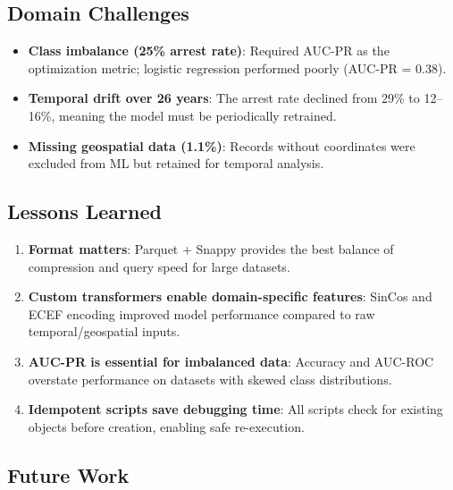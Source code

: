 \subsection{Domain Challenges}

\begin{itemize}
    \item \textbf{Class imbalance (25\% arrest rate)}: Required AUC-PR as the optimization metric; logistic regression performed poorly (AUC-PR = 0.38).
    \item \textbf{Temporal drift over 26 years}: The arrest rate declined from 29\% to 12--16\%, meaning the model must be periodically retrained.
    \item \textbf{Missing geospatial data (1.1\%)}: Records without coordinates were excluded from ML but retained for temporal analysis.
\end{itemize}

\subsection{Lessons Learned}

\begin{enumerate}
    \item \textbf{Format matters}: Parquet + Snappy provides the best balance of compression and query speed for large datasets.
    \item \textbf{Custom transformers enable domain-specific features}: SinCos and ECEF encoding improved model performance compared to raw temporal/geospatial inputs.
    \item \textbf{AUC-PR is essential for imbalanced data}: Accuracy and AUC-ROC overstate performance on datasets with skewed class distributions.
    \item \textbf{Idempotent scripts save debugging time}: All scripts check for existing objects before creation, enabling safe re-execution.
\end{enumerate}

\subsection{Future Work}


